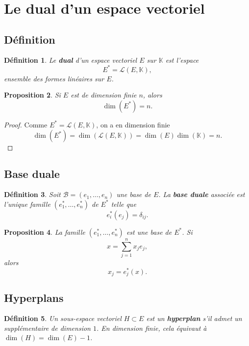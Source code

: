 \documentclass[11pt,a4paper]{article}
\newtheorem{definition}{Définition}[section]
\newtheorem{proposition}[definition]{Proposition}
\theoremstyle{remark}
\newcommand{\K}{\mathbb{K}}
\newcommand{\Lin}{\mathcal{L}}
\begin{document}
\section{Le dual d’un espace vectoriel}

\subsection{Définition}

\begin{definition}
Le \textbf{dual} d’un espace vectoriel \(E\) sur \(\K\) est l’espace
\[
E^\ast=\Lin(E,\K),
\]
ensemble des formes linéaires sur \(E\).
\end{definition}

\begin{proposition}
Si \(E\) est de dimension finie \(n\), alors
\[
\dim(E^\ast)=n.
\]
\end{proposition}

\begin{proof}
Comme \(E^\ast=\Lin(E,\K)\), on a en dimension finie
\[
\dim(E^\ast)=\dim(\Lin(E,\K))=\dim(E)\dim(\K)=n.
\]
\end{proof}

\subsection{Base duale}

\begin{definition}
Soit \(\mathcal B=(e_1,\dots,e_n)\) une base de \(E\). La \textbf{base duale} associée est l’unique famille
\((e_1^\ast,\dots,e_n^\ast)\) de \(E^\ast\) telle que
\[
e_i^\ast(e_j)=\delta_{ij}.
\]
\end{definition}

\begin{proposition}
La famille \((e_1^\ast,\dots,e_n^\ast)\) est une base de \(E^\ast\).
Si
\[
x=\sum_{j=1}^n x_j e_j,
\]
alors
\[
x_j=e_j^\ast(x).
\]
\end{proposition}

\subsection{Hyperplans}

\begin{definition}
Un sous-espace vectoriel \(H\subset E\) est un \textbf{hyperplan} s’il admet un supplémentaire de dimension \(1\).
En dimension finie, cela équivaut à \(\dim(H)=\dim(E)-1\).
\end{definition}
\end{document}
